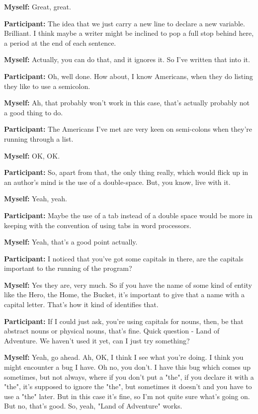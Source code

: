 \documentclass[11pt]{report}
\begin{document}
\begin{linenumbers}
\textbf{Myself:} Great, great.

\textbf{Participant:} The idea that we just carry a new line to declare a new
variable. Brilliant. I think maybe a writer might be inclined to pop a full stop
behind here, a period at the end of each sentence.

\textbf{Myself:} Actually, you can do that, and it ignores it. So I've written that into it.

\textbf{Participant:} Oh, well done. How about, I know Americans, when they do listing they like to use a semicolon.

\textbf{Myself:} Ah, that probably won't work in this case, that's actually probably not a good thing to do.

\textbf{Participant:} The Americans I've met are very keen on semi-colons when they're running through a list.

\textbf{Myself:} OK, OK.

\textbf{Participant:} So, apart from that, the only thing really, which would flick up in an author's mind is the use of a double-space. But, you know, live with it.

\textbf{Myself:} Yeah, yeah.

\textbf{Participant:} Maybe the use of a tab instead of a double space would be more in keeping with the convention of using tabs in word processors.

\textbf{Myself:} Yeah, that's a good point actually.

\textbf{Participant:} I noticed that you've got some capitals in there, are the capitals important to the running of the program?

\textbf{Myself:} Yes they are, very much. So if you have the name of some kind of entity like the Hero, the Home, the Bucket, it's important to give that a name with a capital letter. That's how it kind of identifies that.

\textbf{Participant:} If I could just ask, you're using capitals for nouns, then, be that abstract nouns or physical nouns, that's fine. Quick question - Land of Adventure. We haven't used it yet, can I just try something?

\textbf{Myself:} Yeah, go ahead. Ah, OK, I think I see what you're doing. I
think you might encounter a bug I have. Oh no, you don't. I have this bug which
comes up sometimes, but not always, where if you don't put a "the", if you
declare it with a "the", it's supposed to ignore the "the", but sometimes it
doesn't and you have to use a "the" later. But in this case it's fine, so I'm
not quite sure what's going on. But no, that's good. So, yeah, "Land of
Adventure" works.


\end{linenumbers}
\end{document}

